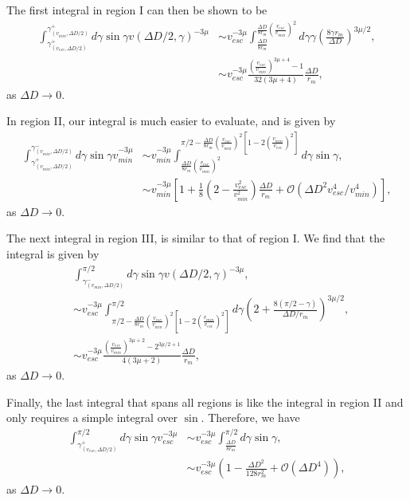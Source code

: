 \documentclass{hitec}
\numberwithin{equation}{section}
\begin{document}
The first integral in region I can then be shown to be
\begin{align}
\int_{\gamma^+_{(v_{esc},\Delta D/2)}}^{\gamma^+_{(v_{min},\Delta D/2)}} d\gamma\sin\gamma v(\Delta D/2, \gamma)^{-3\mu}
&\sim
v_{esc}^{-3\mu}\int_{\frac{\Delta D}{8r_m}}^{\frac{\Delta D}{8r_m}\left(\frac{v_{esc}}{v_{min}}\right)^2} d\gamma \gamma\left(\frac{8\gamma r_m}{\Delta D}\right)^{3\mu/2},\\
&\sim v_{esc}^{-3\mu}\frac{\left(\frac{v_{esc}}{v_{min}}\right)^{3\mu+4}-1}{32(3\mu+4)}\frac{\Delta D}{r_m},
\end{align}
as $\Delta D\to 0$.

In region II, our integral is much easier to evaluate, and is given by
\begin{align}
\int_{\gamma^+_{(v_{min},\Delta D/2)}}^{\gamma^-_{(v_{min},\Delta D/2)}} d\gamma\sin\gamma v_{min}^{-3\mu}
&\sim
v_{min}^{-3\mu}\int_{\frac{\Delta D}{8r_m}\left(\frac{v_{esc}}{v_{min}}\right)^2}^{\pi/2-\frac{\Delta D}{8r_m}\left(\frac{v_{esc}}{v_{min}}\right)^2\left[1-2\left(\frac{v_{min}}{v_{esc}}\right)^2\right]}
d\gamma\sin\gamma,\\
&\sim v_{min}^{-3\mu}\left[1 + \frac{1}{8}\left(2-\frac{v_{esc}^2}{v_{min}^2}\right)\frac{\Delta D}{r_m} + \mathcal{O}(\Delta D^2 v_{esc}^4/v_{min}^4)\right],
\end{align}
as $\Delta D\to 0$.

The next integral in region III, is similar to that of region I. We find that the integral is given by
\begin{align}
&\int_{\gamma^-_{(v_{min},\Delta D/2)}}^{\pi/2} d\gamma\sin\gamma v(\Delta D/2, \gamma)^{-3\mu},\\
&\sim
v_{esc}^{-3\mu} \int_{\pi/2-\frac{\Delta D}{8r_m}\left(\frac{v_{esc}}{v_{min}}\right)^2\left[1-2\left(\frac{v_{min}}{v_{esc}}\right)^2\right]}^{\pi/2}
d\gamma\left(2+\frac{8(\pi/2-\gamma)}{\Delta D/r_m}\right)^{3\mu/2},\\
&\sim v_{esc}^{-3\mu}\frac{\left(\frac{v_{esc}}{v_{min}}\right)^{3\mu+2}-2^{3\mu/2+1}}{4(3\mu+2)}\frac{\Delta D}{r_m},
\end{align}
as $\Delta D\to 0$.

Finally, the last integral that spans all regions is like the integral in region II and only requires a simple integral over $\sin$. Therefore, we have
\begin{align}
\int_{\gamma^+_{(v_{esc},\Delta D/2)}}^{\pi/2} d\gamma\sin\gamma v_{esc}^{-3\mu}
&\sim
v_{esc}^{-3\mu}\int_{\frac{\Delta D}{8r_m}}^{\pi/2} d\gamma\sin\gamma,\\
&\sim v_{esc}^{-3\mu}\left(1 - \frac{\Delta D^2}{128r_m^2} + \mathcal{O}(\Delta D^4)\right),
\end{align}
as $\Delta D\to 0$.
\end{document}
